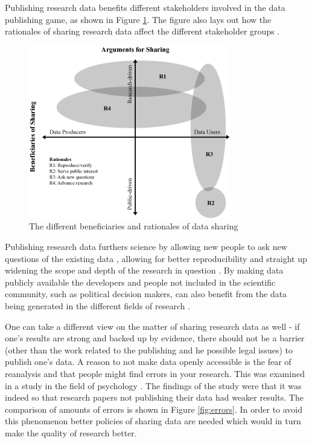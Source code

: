 Publishing research data benefits different stakeholders involved in the
data publishing game, as shown in Figure \ref{fig:beneficaries}. The figure
also lays out how the rationales of sharing research data affect the different
stakeholder groups \cite{DBLP:journals/jasis/Borgman12}.

\begin{figure}
    \begin{centering}
        \includegraphics[width=\textwidth]{images/beneficaries}
    \end{centering}
    \caption{The different beneficiaries and rationales of data sharing \cite{DBLP:journals/jasis/Borgman12}}
    \label{fig:beneficaries}
\end{figure}

Publishing research data furthers science by allowing new people to ask new
questions of the existing data \cite{whitlock2011data}, allowing for better
reproducibility \cite{jasny2011again} and straight up widening the scope and
depth of the research in question \cite{DBLP:journals/see/FischerZ10}.
By making data publicly available the developers and people not included in the
scientific community, such as political decision makers, can also benefit from
the data being generated in the different fields of research
\cite{DBLP:journals/jasis/Borgman12}.

One can take a different view on the matter of sharing research data as well -
if one's results are strong and backed up by evidence, there should not be a
barrier (other than the work related to the publishing and he possible legal
issues) to publish one's data. A reason to not make data openly accessible is
the fear of reanalysis and that people might find errors in your research. This
was examined in a study in the field of psychology
\cite{wicherts2011willingness}. The findings of the study were that it was
indeed so that research papers not publishing their data had weaker results.
The comparison of amounts of errors is shown in Figure \ref{fig:errors}. In order
to avoid this phenomenon better policies of sharing data are needed which would
in turn make the quality of research better.

